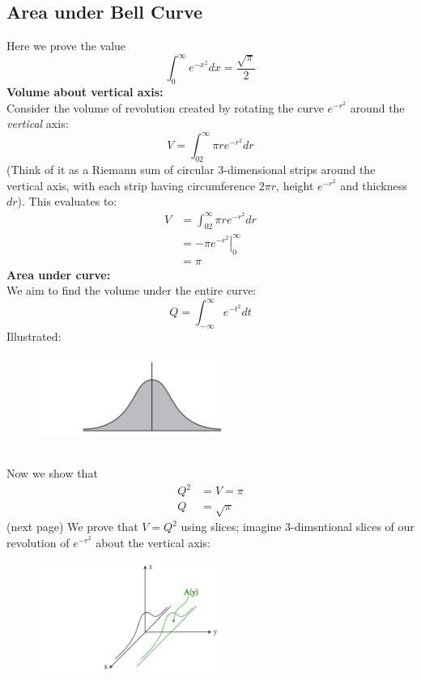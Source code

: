 \documentclass{report}
\begin{document}
\subsection{Area under Bell Curve}%
Here we prove the value
\begin{equation*}
\int^{\infty}_0e^{-x^2}dx=\frac{\sqrt{\pi}}{2}
\end{equation*}
\textbf{Volume about vertical axis:}\\
Consider the volume of revolution created by rotating the curve $e^{-r^2}$ around the \textit{vertical} axis:
\begin{equation*}
V=\int^{\infty}_02\pi re^{-r^2}dr
\end{equation*}
(Think of it as a Riemann sum of circular 3-dimensional strips around the vertical axis,
with each strip having circumference $2\pi r$, height $e^{-r^2}$ and thickness $dr$). 
This evaluates to:
\begin{align*}
V&=\int^{\infty}_02\pi re^{-r^2}dr\\
&=\left.-\pi e^{-r^2}\right|_0^\infty\\
&=\pi
\end{align*}
\textbf{Area under curve:}\\
We aim to find the volume under the entire curve:
\begin{equation*}
Q=\int_{-\infty}^{\infty}e^{-t^2}dt
\end{equation*}
Illustrated:
\begin{figure}[h]
\includegraphics[width=6cm]{Capture39}\\
\centering
{}
\end{figure}\\
Now we show that
\begin{align*}
Q^2&=V=\pi\\
Q&=\sqrt{\pi}
\end{align*}
(next page)
\newpage
\noindent We prove that $V=Q^2$ using slices; imagine 3-dimsntional slices of our 
revolution of $e^{-r^2}$ about the vertical axis:
\begin{figure}[h]
\includegraphics[width=6cm]{Capture40}\\
\centering
{}
\end{figure}\\
\end{document}
